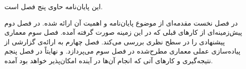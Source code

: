این پایان‌نامه حاوی پنج فصل است.

در فصل نخست مقدمه‌ای از موضوع پایان‌نامه و اهمیت آن ارائه شده. در فصل دوم پیش‌زمینه‌ای از کارهای قبلی که در این زمینه صورت گرفته آمده. فصل سوم معماری پیشنهادی را در سطح نظری بررسی می‌کند. فصل چهارم به ارائه‌ی گزارشی از پیاده‌سازی عملی معماری مطرح‌شده در فصل سوم می‌پردازد. و نهایتاً در فصل پنجم نتیجه‌گیری و کارهای آتی که انجام آن‌ها در آینده امکان‌پذیر خواهد بود آمده.


